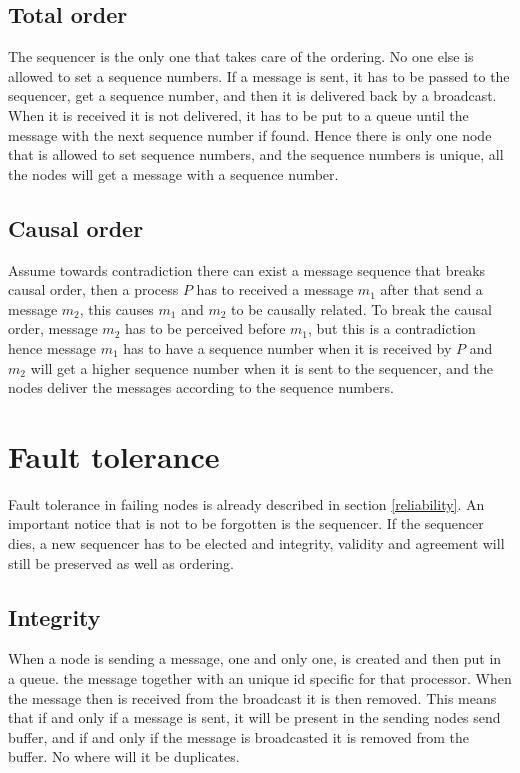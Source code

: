 \documentclass{article}
\begin{document}
\subsection{Total order}
  The sequencer is the only one that takes care of the ordering. 
  No one else is allowed to set a sequence numbers. If a message 
  is sent, it has to be passed to the sequencer, get a sequence 
  number, and then it is delivered back by a broadcast. When it 
  is received it is not delivered, it has to be put to a queue 
  until the message with the next sequence number if found. 
  Hence there is only one node that is allowed to set sequence 
  numbers, and the  sequence numbers is unique, all the nodes 
  will get a message with a sequence number.
  
\subsection{Causal order}
  Assume towards contradiction there can exist a message sequence
  that breaks causal order, then a process $P$ has to received a message $m_1$
  after that send a message $m_2$, this causes $m_1$ and $m_2$ to be causally
  related. To break the causal order, message $m_2$ has to be perceived before $m_1$, 
  but this is a contradiction hence message $m_1$ has to have a sequence number when 
  it is received by $P$ and $m_2$ will get a higher sequence number when it is sent 
  to the sequencer, and the nodes deliver the messages according to the sequence numbers.
\section{Fault tolerance}
  Fault tolerance in failing nodes is already described in section \ref{reliability}.
  An important notice that is not to be forgotten is the sequencer. If the sequencer 
  dies, a new sequencer has to be elected and integrity, validity and agreement will 
  still be preserved as well as ordering.
  \subsection{Integrity}
    When a node is sending a message, one and only one, is created and then put in a queue.
    the message together with an unique id specific for that processor. When the message then is 
    received from the broadcast it is then removed. This means that if and only if a message is 
    sent, it    will be present in the sending nodes send buffer, and if and only if the message
    is broadcasted it is removed from the buffer. No where will it be duplicates.
    
\end{document}
